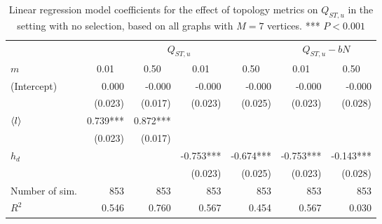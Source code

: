 \begin{table}  
  \caption{Linear regression model coefficients for the effect of topology metrics on $Q_{ST,u}$ in the setting with no selection, based on all graphs with $M=7$ vertices. *** $P < 0.001$}
  \vspace{3mm}
  \centering
    \begin{tabular}{lrrrrrr}
    \toprule
                &  \multicolumn{4}{c}{$Q_{ST,u}$}                                                                          &      \multicolumn{2}{c}{$Q_{ST,u} - b N$}          \\ 
                      \cmidrule(lr){2-5}                                                                                           \cmidrule(lr){6-7}
    $m$         & \multicolumn{1}{c}{0.01} & \multicolumn{1}{c}{0.50} & \multicolumn{1}{c}{0.01} & \multicolumn{1}{c}{0.50} & \multicolumn{1}{c}{0.01} & \multicolumn{1}{c}{0.50} \\ 
    \hline
(Intercept)    &                    0.000 &                   -0.000 &                   -0.000 &                   -0.000 &                   -0.000 &                   -0.000 \\
               &                  (0.023) &                  (0.017) &                  (0.023) &                  (0.025) &                  (0.023) &                  (0.028) \\
$\langle l \rangle$           &                 0.739*** &                 0.872*** &                          &                          &                          &                          \\
               &                  (0.023) &                  (0.017) &                          &                          &                          &                          \\
$h_d$          &                          &                          &                -0.753*** &                -0.674*** &                -0.753*** &                -0.143*** \\
               &                          &                          &                  (0.023) &                  (0.025) &                  (0.023) &                  (0.028) \\
\midrule                                                                                                                                                                           
Number of sim. &                      853 &                      853 &                      853 &                      853 &                      853 &                      853 \\
$R^2$          &                    0.546 &                    0.760 &                    0.567 &                    0.454 &                    0.567 &                    0.030 \\
    \bottomrule
    \end{tabular}
  \label{table:sett1_1var}
\end{table}
\FloatBarrier

